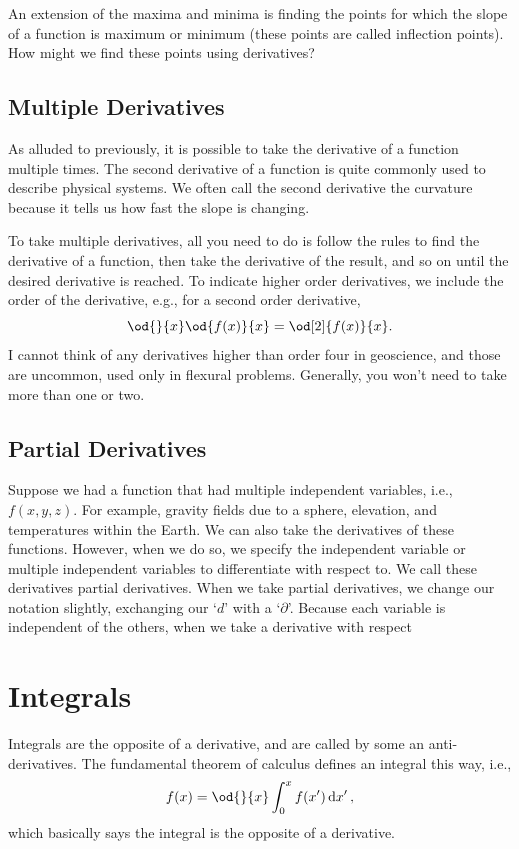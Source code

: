 \documentclass[final,a4paper,12pt]{article}
\theoremstyle{definition}
\begin{document}
An extension of the maxima and minima is finding the points for which the slope
of a function is maximum or minimum (these points are called inflection points).
How might we find these points using derivatives?

\subsection{Multiple Derivatives}
As alluded to previously, it is possible to take the derivative of a function
multiple times.  The second derivative of a function is quite commonly used to
describe physical systems.  We often call the second derivative the curvature
because it tells us how fast the slope is changing.

To take multiple derivatives, all you need to do is follow the rules to find the
derivative of a function, then take the derivative of the result, and so on
until the desired derivative is reached.  To indicate higher order derivatives,
we include the order of the derivative, e.g., for a second order derivative,
\begin{equation}
    \od{}{x}\od{f(x)}{x} = \od[2]{f(x)}{x} .
\end{equation}
I cannot think of
any derivatives higher than order four in geoscience, and those are uncommon,
used only in flexural problems.  Generally, you won't need
to take more than one or two.

\subsection{Partial Derivatives}
Suppose we had a function that had multiple independent variables, i.e.,
$f(x,y,z)$.  For example, gravity fields due to a sphere, elevation, and
temperatures within the Earth.  We can also take the derivatives of these
functions.  However, when we do so, we specify the independent variable or
multiple independent variables to differentiate with respect to.  We call these
derivatives partial derivatives.  When we take partial derivatives, we change
our notation slightly, exchanging our `$d$' with a `$\partial$'.  Because each
variable is independent of the others, when we take a derivative with respect 



\section{Integrals}
Integrals are the opposite of a derivative, and are called by some an
anti-derivatives.  The fundamental theorem of calculus defines an integral this
way, i.e.,
\begin{equation*}
    f(x) = \od{}{x} \int_0^x f(x') \dd{x'} ,
\end{equation*}
which basically says the integral is the opposite of a derivative.
\end{document}
